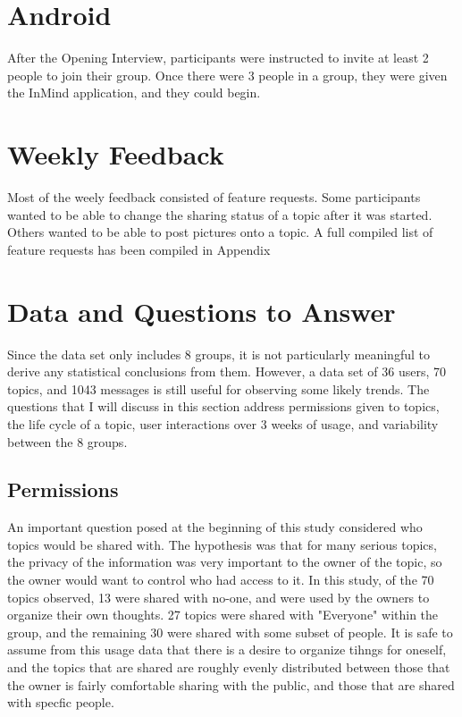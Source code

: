 \section{Android}
  After the Opening Interview, participants were instructed to invite
  at least 2 people to join their group.
  Once there were 3 people in a group,
  they were given the InMind application,
  and they could begin.

  \section{Weekly Feedback}
  Most of the weely feedback consisted of feature requests.
  Some participants wanted to be able to change the sharing status
  of a topic after it was started.
  Others wanted to be able to post pictures onto a topic.
  A full compiled list of feature requests has been compiled in Appendix 

  \section{Data and Questions to Answer}
    Since the data set only includes 8 groups,
    it is not particularly meaningful to derive any statistical conclusions
    from them.
    However, a data set of 36 users, 70 topics, and 1043 messages
    is still useful for observing some likely trends.
    The questions that I will discuss in this section address
    permissions given to topics, the life cycle of a topic,
    user interactions over 3 weeks of usage,
    and variability between the 8 groups.

    \subsection{Permissions}
    An important question posed at the beginning of this study
    considered who topics would be shared with.
    The hypothesis was that for many serious topics,
    the privacy of the information was very important to the owner of the topic,
    so the owner would want to control who had access to it.
    In this study, of the 70 topics observed, 13 were shared with no-one,
    and were used by the owners to organize their own thoughts.
    27 topics were shared with "Everyone" within the group,
    and the remaining 30 were shared with some subset of people.
    It is safe to assume from this usage data that
    there is a desire to organize tihngs for oneself,
    and the topics that are shared are roughly evenly distributed
    between those that the owner is fairly comfortable sharing with the public,
    and those that are shared with specfic people.

